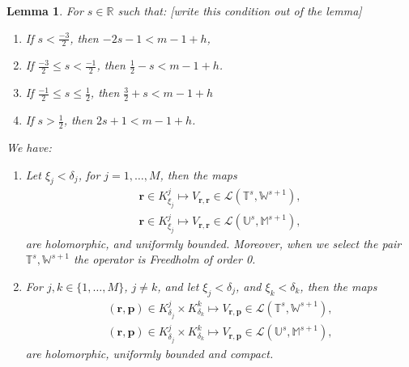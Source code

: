 \documentclass{article}
\newtheorem{lemma}[theorem]{Lemma}
\newcommand{\todo}[1]{{\color{red}[#1]}}
\newcommand{\IM}{{\mathbb M}}
\newcommand{\IR}{{\mathbb R}}
\newcommand{\IU}{{\mathbb U}}
\newcommand{\IT}{{\mathbb T}}
\newcommand{\IW}{{\mathbb W}}
\newcommand{\bp}{{\bm p}}
\newcommand{\br}{\bm{r}}
\begin{document}
\begin{lemma}
\label{lemma:vcomp}For $s\in \IR$ such that: \todo{write this condition out of the lemma}
\begin{enumerate}
\item[i] 
If $s < \frac{-3}{2}$, then $-2s-1<m-1+h$,
\item[ii] 
If $\frac{-3}{2} \leq s < \frac{-1}{2}$, then $\frac{1}{2} -s < m-1+h$.
\item[iii] 
If $\frac{-1}{2} \leq s \leq \frac{1}{2}$, then $\frac{3}{2}+s< m-1 +h$
\item[iv] 
If $s> \frac{1}{2}$, then $2s +1 < m -1 +h $.
\end{enumerate}
We have:
\begin{enumerate}
\item  Let $\xi_j< \delta_j$, for $j=1,\hdots,M$, then the maps
\begin{align*}
\br \in K^j_{\xi_j} \mapsto V_{\br,\br} \in 
\mathcal{L}(\IT^s, \IW^{s+1}), \\
\br \in K^j_{\xi_j} \mapsto V_{\br,\br} \in 
\mathcal{L}(\IU^s, \IM^{s+1}),
\end{align*} 
are holomorphic, and uniformly bounded. Moreover, when we select the pair $\IT^s,\IW^{s+1}$ the operator is Freedholm of order 0. 
\item 
For $j,k \in \{1,\hdots,M\}$, $j \neq k$,  and let $\xi_j < \delta_j$, and $\xi_k  < \delta_k$, then the maps 
\begin{align*}
 (\br,\bp) \in K^j_{\delta_j} \times K^k_{\delta_k} \mapsto V_{\br,\bp} \in 
\mathcal{L}(\IT^s, \IW^{s+1}),\\
 (\br,\bp) \in K^j_{\delta_j} \times K^k_{\delta_k} \mapsto V_{\br,\bp} \in 
\mathcal{L}(\IU^s, \IM^{s+1}),
\end{align*}
are holomorphic, uniformly bounded and compact. 
\end{enumerate}
\end{lemma}
\end{document}
